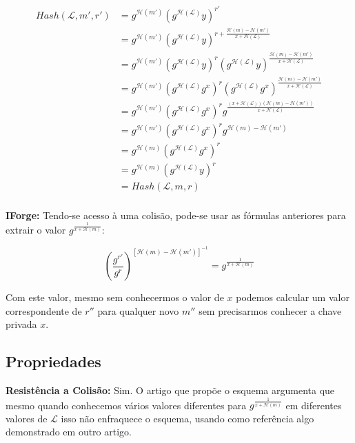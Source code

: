 \documentclass[a4paper]{article}
\begin{document}
\begin{equation}
\begin{split}
  Hash(\mathcal{L}, m', r') &= g^{\mathcal{H}(m')}(g^{\mathcal{H}(\mathcal{L})}y)^{r'}\\
  &=g^{\mathcal{H}(m')}(g^{\mathcal{H}(\mathcal{L})}y)^{r + \frac{\mathcal{H}(m)-\mathcal{H}(m')}{x+\mathcal{H}(\mathcal{L})}}\\
  &=g^{\mathcal{H}(m')}(g^{\mathcal{H}(\mathcal{L})}y)^{r}(g^{\mathcal{H}(\mathcal{L})}y)^{\frac{\mathcal{H}(m)-\mathcal{H}(m')}{x+\mathcal{H}(\mathcal{L})}}\\
  &=g^{\mathcal{H}(m')}(g^{\mathcal{H}(\mathcal{L})}g^x)^{r}(g^{\mathcal{H}(\mathcal{L})}g^x)^{\frac{\mathcal{H}(m)-\mathcal{H}(m')}{x+\mathcal{H}(\mathcal{L})}}\\
  &=g^{\mathcal{H}(m')}(g^{\mathcal{H}(\mathcal{L})}g^x)^{r}g^{\frac{(x+\mathcal{H}(\mathcal{L}))(\mathcal{H}(m)-\mathcal{H}(m'))}{x+\mathcal{H}(\mathcal{L})}}\\
  &=g^{\mathcal{H}(m')}(g^{\mathcal{H}(\mathcal{L})}g^x)^{r}g^{\mathcal{H}(m)-\mathcal{H}(m')}\\
  &=g^{\mathcal{H}(m)}(g^{\mathcal{H}(\mathcal{L})}g^x)^{r}\\
  &=g^{\mathcal{H}(m)}(g^{\mathcal{H}(\mathcal{L})}y)^{r}\\
  &=Hash(\mathcal{L}, m, r)\\
\end{split}
\end{equation}

\textbf{IForge:} Tendo-se acesso à uma colisão, pode-se usar as
fórmulas anteriores para extrair o valor
$g^{\frac{1}{x+\mathcal{H}(m)}}$:

$$
\left(\frac{g^{r'}}{g^r}\right)^{[\mathcal{H}(m)-\mathcal{H}(m')]^{-1}} = g^{\frac{1}{x+\mathcal{H}(m)}}
$$


Com este valor, mesmo sem conhecermos o valor de $x$ podemos calcular
um valor correspondente de $r''$ para qualquer novo $m''$ sem
precisarmos conhecer a chave privada $x$.

\subsection{Propriedades}

\textbf{Resistência a Colisão: }Sim. O artigo que propõe o esquema
argumenta que mesmo quando conhecemos vários valores diferentes para
$g^{\frac{1}{x+\mathcal{H}(m)}}$ em diferentes valores de
$\mathcal{L}$ isso não enfraquece o esquema, usando como referência
algo demonstrado em outro artigo.
\end{document}
